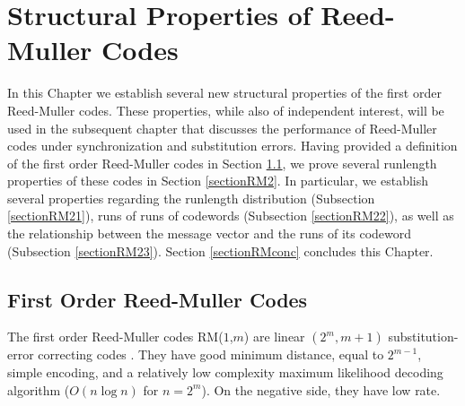 \chapter[Structural Properties of Reed-Muller Codes]{Structural Properties of Reed-Muller
Codes}\label{reed-muller-struc} In this Chapter we establish
several new structural properties of the first order Reed-Muller
codes. These properties, while also of independent interest, will
be used in the subsequent chapter that discusses the performance
of Reed-Muller codes under synchronization and substitution
errors. Having provided a definition of the first order
Reed-Muller codes in Section \ref{sectionRM1}, we prove several
runlength properties of these codes in Section \ref{sectionRM2}.
In particular, we establish several properties regarding the
runlength distribution (Subsection \ref{sectionRM21}), runs of
runs of codewords (Subsection \ref{sectionRM22}), as well as the
relationship between the message vector and the runs of its
codeword (Subsection \ref{sectionRM23}). Section
\ref{sectionRMconc} concludes this Chapter.





%




\section{First Order Reed-Muller Codes}\label{sectionRM1}
The first order Reed-Muller codes RM($1$,$m$) are linear $(2^m,
m+1)$ substitution-error correcting codes \cite{mws:77}. They have
good minimum distance, equal to $2^{m-1}$, simple encoding, and a
relatively low complexity maximum likelihood decoding algorithm
($O(n \log n)$ for $n=2^m$). On the negative side, they have low
rate.

